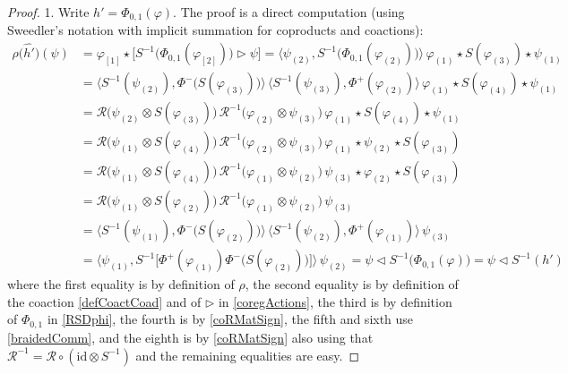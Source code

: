 \documentclass[10pt,a4paper]{amsart}
\begin{document}
\begin{proof}
1. Write $h' = \Phi_{0,1}(\varphi)$. The proof is a direct computation (using Sweedler's notation with implicit summation for coproducts and coactions):
\begin{align*}
\rho\bigl( \widehat{h'} \bigr)(\psi) &= \varphi_{[1]} \star \bigl[ S^{-1}\bigl( \Phi_{0,1}(\varphi_{[2]})  \bigr) \rhd \psi \bigr] = \bigl\langle \psi_{(2)}, S^{-1}\bigl( \Phi_{0,1}(\varphi_{(2)}) \bigr) \bigr\rangle \, \varphi_{(1)} \star S(\varphi_{(3)}) \star \psi_{(1)}\\
&=\bigl\langle S^{-1}(\psi_{(2)}), \Phi^-\bigl( S(\varphi_{(3)}) \bigr) \bigr\rangle \, \bigl\langle S^{-1}(\psi_{(3)}), \Phi^+(\varphi_{(2)}) \bigr\rangle \, \varphi_{(1)} \star S(\varphi_{(4)}) \star \psi_{(1)}\\
&=\mathcal{R}\bigl( \psi_{(2)} \otimes S(\varphi_{(3)}) \bigr) \, \mathcal{R}^{-1}\bigl( \varphi_{(2)} \otimes \psi_{(3)} \bigr) \, \varphi_{(1)} \star S(\varphi_{(4)}) \star \psi_{(1)}\\
&=\mathcal{R}\bigl( \psi_{(1)} \otimes S(\varphi_{(4)}) \bigr) \, \mathcal{R}^{-1}\bigl( \varphi_{(2)} \otimes \psi_{(3)} \bigr) \, \varphi_{(1)} \star \psi_{(2)} \star S(\varphi_{(3)})\\
&=\mathcal{R}\bigl( \psi_{(1)} \otimes S(\varphi_{(4)}) \bigr) \, \mathcal{R}^{-1}\bigl( \varphi_{(1)} \otimes \psi_{(2)} \bigr) \, \psi_{(3)} \star \varphi_{(2)} \star S(\varphi_{(3)})\\
&=\mathcal{R}\bigl( \psi_{(1)} \otimes S(\varphi_{(2)}) \bigr) \, \mathcal{R}^{-1}\bigl( \varphi_{(1)} \otimes \psi_{(2)} \bigr) \, \psi_{(3)}\\
&=\bigl\langle S^{-1}(\psi_{(1)}), \Phi^-\bigl( S(\varphi_{(2)}) \bigr) \bigr\rangle \, \bigl\langle S^{-1}(\psi_{(2)}), \Phi^+(\varphi_{(1)}) \bigr\rangle \, \psi_{(3)}\\
&=\bigl\langle \psi_{(1)}, S^{-1}\bigl[ \Phi^+(\varphi_{(1)}) \Phi^-\bigl( S(\varphi_{(2)}) \bigr) \bigr] \bigr\rangle \, \psi_{(2)} = \psi \lhd S^{-1}\bigl( \Phi_{0,1}(\varphi) \bigr) = \psi \lhd S^{-1}(h')
\end{align*}
where the first equality is by definition of $\rho$, the second equality is by definition of the coaction \eqref{defCoactCoad} and of $\rhd$ in \eqref{coregActions}, the third is by definition of $\Phi_{0,1}$ in \eqref{RSDphi}, the fourth is by \eqref{coRMatSign}, the fifth and sixth use \eqref{braidedComm}, and the eighth is by \eqref{coRMatSign} also using that $\mathcal{R}^{-1} = \mathcal{R} \circ (\mathrm{id} \otimes S^{-1})$ and the remaining equalities are easy.

\end{proof}
\end{document}
